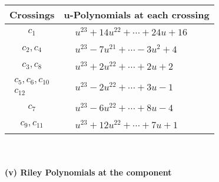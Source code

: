 \documentclass[1p]{elsarticle_modified}
\theoremstyle{definition}
\begin{document}
\begin{tabular}{m{50pt}|m{274pt}}
Crossings & \hspace{64pt}u-Polynomials at each crossing \\
\hline $$\begin{aligned}c_{1}\end{aligned}$$&$\begin{aligned}
&u^{23}+14 u^{22}+\cdots+24 u+16
\end{aligned}$\\
\hline $$\begin{aligned}c_{2},c_{4}\end{aligned}$$&$\begin{aligned}
&u^{23}-7 u^{21}+\cdots-3 u^2+4
\end{aligned}$\\
\hline $$\begin{aligned}c_{3},c_{8}\end{aligned}$$&$\begin{aligned}
&u^{23}+2 u^{22}+\cdots+2 u+2
\end{aligned}$\\
\hline $$\begin{aligned}c_{5},c_{6},c_{10}\\c_{12}\end{aligned}$$&$\begin{aligned}
&u^{23}-2 u^{22}+\cdots+3 u-1
\end{aligned}$\\
\hline $$\begin{aligned}c_{7}\end{aligned}$$&$\begin{aligned}
&u^{23}-6 u^{22}+\cdots+8 u-4
\end{aligned}$\\
\hline $$\begin{aligned}c_{9},c_{11}\end{aligned}$$&$\begin{aligned}
&u^{23}+12 u^{22}+\cdots+7 u+1
\end{aligned}$\\
\hline
\end{tabular}\\~\\
\newpage\renewcommand{\arraystretch}{1}
\flushleft \textbf{(v) Riley Polynomials at the component}\newline \\
\end{document}
